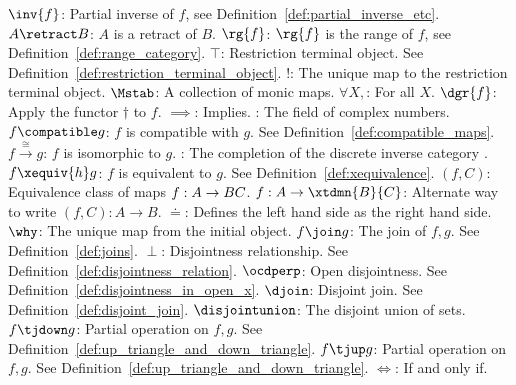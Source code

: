 \begin{tabbing}
\addsymbol \mbox{$\inv{f}$}: {Partial inverse of $f$, see Definition~\ref{def:partial_inverse_etc}.}
\addsymbol \mbox{$A\retract B$}: {$A$ is a retract of $B$.}
\addsymbol \mbox{$\rg{f}$}: {$\rg{f}$ is the range of $f$, see Definition~\ref{def:range_category}.}
\addsymbol \mbox{$\top$}: {Restriction terminal object. See  Definition~\ref{def:restriction_terminal_object}.}
\addsymbol \mbox{$!$}: {The unique map to the restriction terminal object.}
\addsymbol \mbox{$\Mstab$}: {A collection of monic maps.}
\addsymbol \mbox{$\forall X,$}: {For all $X$.}
\addsymbol \mbox{$\dgr{f}$}: {Apply the functor $\dagger$ to $f$.}
\addsymbol \mbox{$\implies$}: {Implies.}
\addsymbol \mbox{\complex}: {The field of complex numbers.}
\addsymbol \mbox{$f\compatible g$}: {$f$ is compatible with $g$. See  Definition~\ref{def:compatible_maps}.}
\addsymbol \mbox{$f\xrightarrow{\cong}g$}: {$f$ is isomorphic to $g$.}
\addsymbol \mbox{\Xt}: {The completion of the discrete inverse category \X.}
\addsymbol \mbox{$f\xequiv{h}g$}: {$f$ is equivalent to $g$. See  Definition~\ref{def:xequivalence}.}
\addsymbol \mbox{$(f,C)$}: {Equivalence class of maps $f:A\to B\*C$.}
\addsymbol \mbox{$f:A\to\xtdmn{B}{C}$}: {Alternate way to write $(f,C):A \to B$.}
\addsymbol \mbox{$\doteq$}: {Defines the left hand side as the right hand side.}
\addsymbol \mbox{$\why$}: {The unique map from the initial object.}
\addsymbol \mbox{$f\join g$}: {The join of $f,g$. See Definition~\ref{def:joins}.}
\addsymbol \mbox{$\perp$}: {Disjointness relationship. See  Definition~\ref{def:disjointness_relation}.}
\addsymbol \mbox{$\ocdperp$}: {Open disjointness. See Definition~\ref{def:disjointness_in_open_x}.}
\addsymbol \mbox{$\djoin$}: {Disjoint join. See Definition~\ref{def:disjoint_join}.}
\addsymbol \mbox{$\disjointunion$}: {The disjoint union of sets.}
\addsymbol \mbox{$f\tjdown g$}: {Partial operation on $f,g$. See Definition~\ref{def:up_triangle_and_down_triangle}.}
\addsymbol \mbox{$f\tjup g$}: {Partial operation on $f,g$. See Definition~\ref{def:up_triangle_and_down_triangle}.}
\addsymbol \mbox{$\iff$}: {If and only if.}
\end{tabbing}


